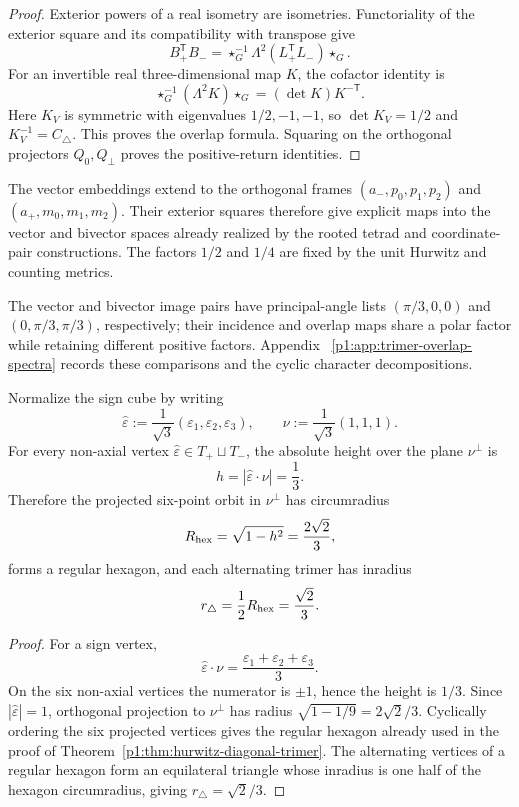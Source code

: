 \documentclass[11pt]{article}
\begin{document}
\begin{proof}
Exterior powers of a real isometry are isometries. Functoriality
of the exterior square and its compatibility with transpose give
\[
 B_+^{\mathsf T}B_-
 =\star_G^{-1}\Lambda^2(L_+^{\mathsf T}L_-)\star_G.
\]
For an invertible real three-dimensional map \(K\), the cofactor
identity is
\[
 \star_G^{-1}(\Lambda^2K)\star_G=(\det K)K^{-\mathsf T}.
\]
Here \(K_V\) is symmetric with eigenvalues \(1/2,-1,-1\), so
\(\det K_V=1/2\) and \(K_V^{-1}=C_\triangle\).
This proves the overlap formula. Squaring on the orthogonal
projectors \(Q_0,Q_\perp\) proves the positive-return identities.
\end{proof}

The vector embeddings extend to the orthogonal frames
\((a_-,p_0,p_1,p_2)\) and \((a_+,m_0,m_1,m_2)\).
Their exterior squares therefore give explicit maps into the
vector and bivector spaces already realized by the rooted tetrad
and coordinate-pair constructions. The factors \(1/2\) and \(1/4\)
are fixed by the unit Hurwitz and counting metrics.

The vector and bivector image pairs have principal-angle lists
\((\pi/3,0,0)\) and \((0,\pi/3,\pi/3)\), respectively;
their incidence and overlap maps share a polar factor while
retaining different positive factors. Appendix~
\ref{p1:app:trimer-overlap-spectra} records these comparisons
and the cyclic character decompositions.

\begin{proposition}
\label{p1:prop:projected-trimer-metric}
Normalize the sign cube by writing
\[
\widehat\varepsilon
:=\frac1{\sqrt3}(\varepsilon_1,\varepsilon_2,\varepsilon_3),
\qquad
\nu:=\frac1{\sqrt3}(1,1,1).
\]
For every non-axial vertex \(\widehat\varepsilon\in T_+\sqcup T_-\), the absolute
height over the plane \(\nu^\perp\) is
\[
 h=|\widehat\varepsilon\cdot\nu|=\frac13.
\]
Therefore the projected six-point orbit in \(\nu^\perp\) has circumradius
\[
R_{\rm hex}=\sqrt{1-h^2}=\frac{2\sqrt2}{3},
\]
forms a regular hexagon, and each alternating trimer has inradius
\[
r_\triangle=\frac12 R_{\rm hex}=\frac{\sqrt2}{3}.
\]
\end{proposition}

\begin{proof}
For a sign vertex,
\[
\widehat\varepsilon\cdot\nu
=\frac{\varepsilon_1+\varepsilon_2+\varepsilon_3}{3}.
\]
On the six non-axial vertices the numerator is \(\pm1\), hence the height is
\(1/3\).  Since \(|\widehat\varepsilon|=1\), orthogonal projection to \(\nu^\perp\)
has radius \(\sqrt{1-1/9}=2\sqrt2/3\).  Cyclically ordering the six projected
vertices gives the regular hexagon already used in the proof of
Theorem~\ref{p1:thm:hurwitz-diagonal-trimer}.  The alternating vertices of a
regular hexagon form an equilateral triangle whose inradius is one half of the
hexagon circumradius, giving \(r_\triangle=\sqrt2/3\).
\end{proof}
\end{document}
